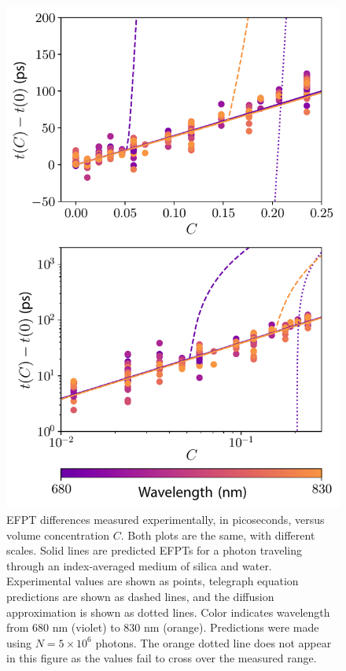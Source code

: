 

\begin{figure}[hp]
\begin{center}
\includegraphics[width=0.8\columnwidth]{Figures/final_predictions_with_data.pdf}
\caption{\label{fig:alldata} EFPT differences measured experimentally, in picoseconds, versus volume concentration $C$. Both plots are the same, with different scales. Solid lines are predicted EFPTs for a photon traveling through an index-averaged medium of silica and water. Experimental values are shown as points, telegraph equation predictions are shown as dashed lines, and the diffusion approximation is shown as dotted lines. Color indicates wavelength from 680 nm (violet) to 830 nm (orange). Predictions were made using $N=5\times10^6$ photons. The orange dotted line does not appear in this figure as the values fail to cross over the measured range.}
\end{center}
\end{figure}

